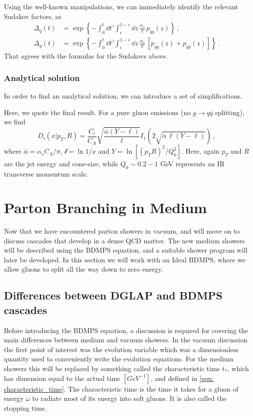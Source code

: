 \documentclass[main.tex]{subfiles}
\begin{document}
Using the well-known manipulations, we can immediately identify the relevant Sudakov factors, as
\begin{align}
    \Delta_q(t) &= \exp \left\{ - \int_0^t \dd t'\int_\epsilon^{1-\epsilon} \dd z\, \frac{\alpha_s}{\pi} \,p_{qq}(z) \right\} \,,\\
    \Delta_g(t) &= \exp \left\{ - \int_0^t \dd t'\int_\epsilon^{1-\epsilon} \dd z\, \frac{\alpha_s}{\pi} \,\left[ p_{gg}(z) + p_{qg}(z) \right] \right\} \,.
\end{align}
That agrees with the formulas for the Sudakovs above.

\subsubsection{Analytical solution}

In order to find an analytical solution, we can introduce a set of simplifications. 

Here, we quote the final result. For a pure gluon emissions (no $g\to q \bar q$ splitting), we find
\begin{equation}
    D_i(x|p_T,R) = \frac{C_i}{C_A}\sqrt{\frac{\bar\alpha (Y - \ell)}{\ell}} I_1 \left( 2 \sqrt{\bar \alpha \,\ell (Y- \ell)} \right) \,,
\end{equation}
where \(\bar \alpha =\alpha_s C_A/\pi\), \(\mathcal{l} = \ln 1/x\) and \(Y= \ln[ (p_T R)^2/Q_0^2]\). Here, again \(p_T\) and \(R\)
 are the jet energy and cone-size, while \(Q_0 \sim 0.2-1\) GeV represents an IR transverse momentum scale.


\newpage
\section{Parton Branching in Medium}
Now that we have encountered parton showers in vacuum, and will move on to discuss cascades that develop in a dense QCD matter. \cite{Energy_flow_medium_cascade_2016} The new medium showers will be described using the BDMPS equation, and a suitable shower program will later be developed.
In this section we will work with an Ideal BDMPS, where we allow gluons to split all the way down to zero energy.

\subsection{Differences between DGLAP and BDMPS cascades}
Before introducing the BDMPS equation, a discussion is required for covering the main differences between medium and vacuum showers. In the vacuum discussion the first point of interest was the evolution variable which was a dimensionless quantity used to conveniently write the evolution equations. For the medium showers this will be replaced by something called the characteristic time \(t_*\), which has dimension equal to the actual time \([GeV^{-1}]\), and defined in \autoref{eqn: characteristic_time}. The characteristic time is the time it takes for a gluon of energy \(\omega\) to radiate most of its energy into soft gluons. It is also called the stopping time.
\end{document}
